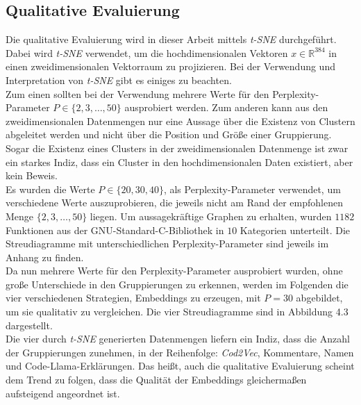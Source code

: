 \documentclass[12pt,letterpaper,ngerman]{article}
\begin{document}
\subsection{Qualitative Evaluierung} 
Die qualitative Evaluierung wird in dieser Arbeit mittels
\textit{t-SNE} durchgeführt. Dabei wird \textit{t-SNE} verwendet,
um die hochdimensionalen Vektoren $x \in \mathbb{R}^{384}$ in einen
zweidimensionalen Vektorraum zu projizieren. Bei der Verwendung und 
Interpretation von \textit{t-SNE} gibt es einiges zu beachten. \\
Zum einen sollten bei der Verwendung mehrere Werte für den
Perplexity-Parameter $P \in \{2,3,\dots ,50\}$ ausprobiert werden. 
Zum anderen kann aus den zweidimensionalen Datenmengen nur eine Aussage
über die Existenz von Clustern abgeleitet werden und nicht über die
Position und Größe einer Gruppierung. Sogar die Existenz eines Clusters 
in der zweidimensionalen Datenmenge ist zwar ein starkes Indiz,
dass ein Cluster in den hochdimensionalen Daten existiert, 
aber kein Beweis.\\
Es wurden die Werte $P \in \{20, 30, 40\}$, als Perplexity-Parameter 
verwendet, um verschiedene Werte auszuprobieren, die jeweils nicht 
am Rand der empfohlenen Menge $\{2,3, \dots, 50\}$ liegen.
Um aussagekräftige Graphen zu erhalten, wurden $1182$ Funktionen aus
der GNU-Standard-C-Bibliothek in $10$ Kategorien unterteilt. Die 
Streudiagramme mit unterschiedlichen Perplexity-Parameter sind 
jeweils im Anhang zu finden.\\
Da nun mehrere Werte für den Perplexity-Parameter ausprobiert wurden,
ohne große Unterschiede in den Gruppierungen zu erkennen, werden im 
Folgenden die vier verschiedenen Strategien, Embeddings zu erzeugen,
mit $P = 30$ abgebildet, um sie qualitativ zu vergleichen. Die 
vier Streudiagramme sind in Abbildung 4.3 dargestellt.\\
Die vier durch \textit{t-SNE} generierten Datenmengen liefern ein Indiz,
dass die Anzahl der Gruppierungen zunehmen, in der Reihenfolge: 
\textit{Cod2Vec}, Kommentare, Namen und Code-Llama-Erklärungen.
Das heißt, auch die qualitative Evaluierung scheint dem Trend zu 
folgen, dass die Qualität der Embeddings gleichermaßen aufsteigend
angeordnet ist.
%
\end{document}
